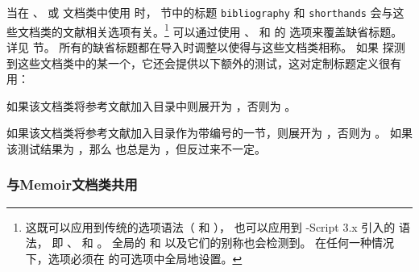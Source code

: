 当在 、 或  文档类中使用 \biblatex 时，
 节中的标题 \texttt{bibliography} 和 \texttt{shorthands} 会与这些文档类的文献相关选项有关。\footnote{%
	这既可以应用到传统的选项语法（ 和 ），
	也可以应用到 -Script 3.x 引入的 \keyval 语法，
	即 、 和 。
	全局的  和  以及它们的别称也会检测到。
	在任何一种情况下，选项必须在  的可选项中全局地设置。
}
可以通过使用 、 和  的  选项来覆盖缺省标题。
详见  节。
所有的缺省标题都在导入时调整以使得与这些文档类相称。
如果 \biblatex 探测到这些文档类中的某一个，它还会提供以下额外的测试，这对定制标题定义很有用：

\begin{ltxsyntax}



如果该文档类将参考文献加入目录中则展开为 ，否则为 。



如果该文档类将参考文献加入目录作为带编号的一节，则展开为 ，否则为 。
如果该测试结果为 ，那么  也总是为 ，但反过来不一定。

\end{ltxsyntax}

\subsubsection{与Memoir文档类共用}%
\label{use:cav:mem}

